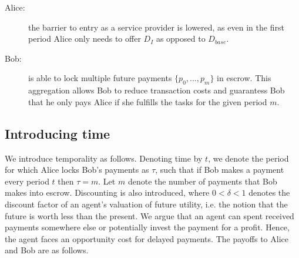 \documentclass[runningheads]{llncs}
\newcommand{\rk}[1]{\todo[linecolor=red,backgroundcolor=red!25,bordercolor=blue,inline,caption={}]{Comment by Rami: #1}}
\newcommand{\tolgu}[1]{\todo[linecolor=yellow,backgroundcolor=yellow!25,bordercolor=yellow,inline,caption={}]{Todo for Lewis: #1}}
\begin{document}
\begin{description}
    \item[Alice:] the barrier to entry as a service provider is lowered, as even in the first period Alice only needs to offer $D_I$ as opposed to $D_{base}$.
    \item[Bob:] is able to lock multiple future payments $\{p_0, ..., p_m\}$ in escrow. This aggregation allows Bob to reduce transaction costs and guarantess Bob that he only pays Alice if she fulfills the tasks for the given period $m$.
\end{description}

\subsection{Introducing time}


We introduce temporality as follows.
Denoting time by $t$, we denote the period for which Alice locks Bob's payments as $\tau$, such that if Bob makes a payment every period $t$ then $\tau=m$.
Let $m$ denote the number of payments that Bob makes into escrow.
Discounting is also introduced, where $0<\delta<1$ denotes the discount factor of an agent's valuation of future utility, i.e. the notion that the future is worth less than the present.
We argue that an agent can spent received payments somewhere else or potentially invest the payment for a profit.
Hence, the agent faces an opportunity cost for delayed payments.
The payoffs to Alice and Bob are as follows. 
\end{document}
